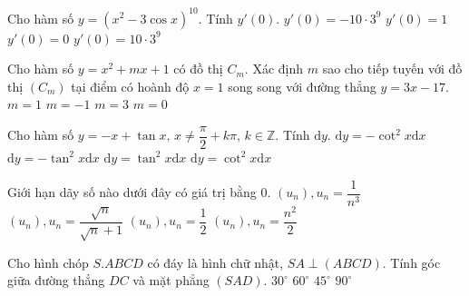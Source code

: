 \begin{ex}%
Cho hàm số $y=(x^2-3\cos x )^{10}$. Tính $y'(0)$.
\choice
{$y'(0)=-10\cdot 3^9$}
{$y'(0)=1$}
{\True $y'(0)=0$}
{$y'(0)=10\cdot 3^9$}
\end{ex}

\begin{ex}%
Cho hàm số $y=x^2+mx+1$ có đồ thị $C_m$. Xác định $m$ sao cho tiếp tuyến với đồ thị $(C_m) $ tại điểm có hoành độ $x=1$ song song với đường thẳng $y=3x-17$.
\choice
{\True $m=1$}
{$m=-1$}
{$m=3$}
{$m=0$}
\end{ex}

\begin{ex}%
Cho hàm số $y=-x+\tan x, \, x\ne \dfrac{\pi}{2}+k\pi, \, k\in \mathbb{Z} $. Tính $\mathrm{d}y$.
\choice
{ $\mathrm{d}y=-\cot ^2 x  \mathrm{d}x$}
{ $\mathrm{d}y=-\tan ^2 x  \mathrm{d}x$}
{\True $\mathrm{d}y=\tan ^2 x  \mathrm{d}x$}
{$\mathrm{d}y=\cot ^2 x  \mathrm{d}x$}
\end{ex}

\begin{ex}%
Giới hạn dãy số nào dưới đây có giá trị bằng $0$.
\choice
{\True $(u_n), u_n=\dfrac{1}{n^3}$}
{$(u_n), u_n=\dfrac{\sqrt{n}}{\sqrt{n}+1}$}
{$(u_n), u_n=\dfrac{1}{2}$}
{$(u_n), u_n=\dfrac{n^2}{2}$}
\end{ex}

\begin{ex}%
Cho hình chóp $S.ABCD$ có đáy là hình chữ nhật, $SA\perp (ABCD)$. Tính góc giữa đường thẳng $DC$ và mặt phẳng $(SAD)$.
\choice
{$30^{\circ}$}
{$60^{\circ}$}
{$45^{\circ}$}
{\True $90^{\circ}$}
\end{ex}

